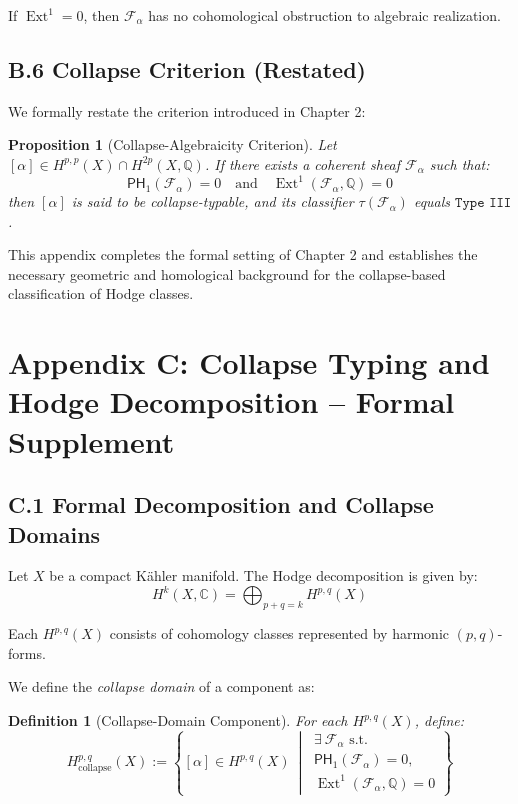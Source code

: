 \documentclass[11pt]{article}
\newtheorem{definition}[theorem]{Definition}
\newtheorem{proposition}[theorem]{Proposition}
\DeclareMathOperator{\Ext}{Ext}
\begin{document}
If $\Ext^1 = 0$, then $\mathcal{F}_\alpha$ has no cohomological obstruction to algebraic realization.

\subsection*{B.6 Collapse Criterion (Restated)}

We formally restate the criterion introduced in Chapter 2:

\begin{proposition}[Collapse-Algebraicity Criterion]
Let $[\alpha] \in H^{p,p}(X) \cap H^{2p}(X, \mathbb{Q})$.  
If there exists a coherent sheaf $\mathcal{F}_\alpha$ such that:
\[
\mathsf{PH}_1(\mathcal{F}_\alpha) = 0 \quad \text{and} \quad \Ext^1(\mathcal{F}_\alpha, \mathbb{Q}) = 0
\]
then $[\alpha]$ is said to be \emph{collapse-typable}, and its classifier $\tau(\mathcal{F}_\alpha)$ equals $\texttt{Type III}$.
\end{proposition}

This appendix completes the formal setting of Chapter 2 and establishes the necessary geometric and homological background for the collapse-based classification of Hodge classes.



\section*{Appendix C: Collapse Typing and Hodge Decomposition – Formal Supplement}


\subsection*{C.1 Formal Decomposition and Collapse Domains}

Let $X$ be a compact Kähler manifold. The Hodge decomposition is given by:
\[
H^k(X, \mathbb{C}) = \bigoplus_{p+q=k} H^{p,q}(X)
\]

Each $H^{p,q}(X)$ consists of cohomology classes represented by harmonic $(p,q)$-forms.

We define the \emph{collapse domain} of a component as:

\begin{definition}[Collapse-Domain Component]
For each $H^{p,q}(X)$, define:
\[
H^{p,q}_{\text{collapse}}(X) := \left\{ [\alpha] \in H^{p,q}(X) \ \middle| \ 
\begin{array}{l}
\exists \ \mathcal{F}_\alpha \text{ s.t.} \\
\mathsf{PH}_1(\mathcal{F}_\alpha) = 0, \\
\Ext^1(\mathcal{F}_\alpha, \mathbb{Q}) = 0
\end{array}
\right\}
\]
\end{definition}
\end{document}
